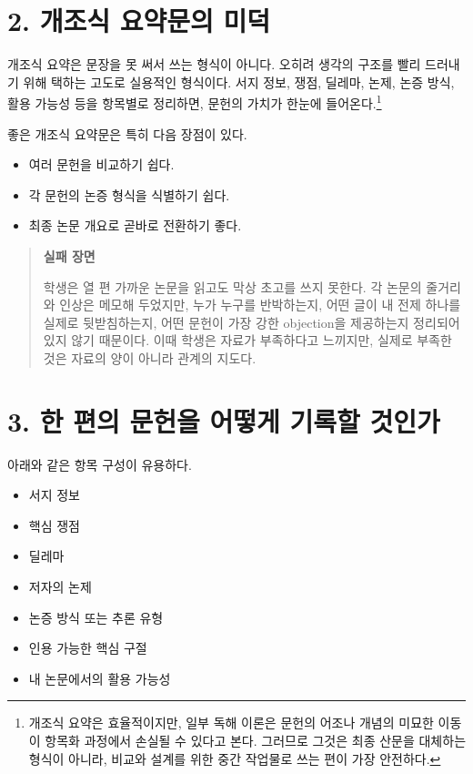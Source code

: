 \section{2. 개조식 요약문의 미덕}\label{2-uxac1cuxc870uxc2dd-uxc694uxc57duxbb38uxc758-uxbbf8uxb355}

개조식 요약은 문장을 못 써서 쓰는 형식이 아니다. 오히려 생각의 구조를 빨리 드러내기 위해 택하는 고도로 실용적인 형식이다. 서지 정보, 쟁점, 딜레마, 논제, 논증 방식, 활용 가능성 등을 항목별로 정리하면, 문헌의 가치가 한눈에 들어온다.\footnote{개조식 요약은 효율적이지만, 일부 독해 이론은 문헌의 어조나 개념의 미묘한 이동이 항목화 과정에서 손실될 수 있다고 본다. 그러므로 그것은 최종 산문을 대체하는 형식이 아니라, 비교와 설계를 위한 중간 작업물로 쓰는 편이 가장 안전하다.}

좋은 개조식 요약문은 특히 다음 장점이 있다.

\begin{itemize}
\tightlist
\item
  여러 문헌을 비교하기 쉽다.
\item
  각 문헌의 논증 형식을 식별하기 쉽다.
\item
  최종 논문 개요로 곧바로 전환하기 좋다.
\end{itemize}

\begin{quote}
\textbf{실패 장면}

학생은 열 편 가까운 논문을 읽고도 막상 초고를 쓰지 못한다. 각 논문의 줄거리와 인상은 메모해 두었지만, 누가 누구를 반박하는지, 어떤 글이 내 전제 하나를 실제로 뒷받침하는지, 어떤 문헌이 가장 강한 objection을 제공하는지 정리되어 있지 않기 때문이다. 이때 학생은 자료가 부족하다고 느끼지만, 실제로 부족한 것은 자료의 양이 아니라 관계의 지도다.
\end{quote}

\section{3. 한 편의 문헌을 어떻게 기록할 것인가}\label{3-uxd55c-uxd3b8uxc758-uxbb38uxd5ccuxc744-uxc5b4uxb5bbuxac8c-uxae30uxb85duxd560-uxac83uxc778uxac00}

아래와 같은 항목 구성이 유용하다.

\begin{itemize}
\tightlist
\item
  서지 정보
\item
  핵심 쟁점
\item
  딜레마
\item
  저자의 논제
\item
  논증 방식 또는 추론 유형
\item
  인용 가능한 핵심 구절
\item
  내 논문에서의 활용 가능성
\end{itemize}

